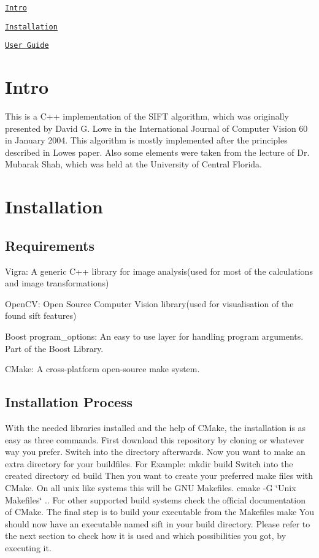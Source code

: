 
\begin{DoxyItemize}
\item \href{#intro}{\tt Intro}
\item \href{#installation}{\tt Installation}
\item \href{#user-guide}{\tt User Guide}
\end{DoxyItemize}

\section*{Intro}

This is a C++ implementation of the S\+I\+F\+T algorithm, which was originally presented by David G. Lowe in the International Journal of Computer Vision 60 in January 2004. This algorithm is mostly implemented after the principles described in Lowe\textquotesingle{}s paper. Also some elements were taken from the lecture of Dr. Mubarak Shah, which was held at the University of Central Florida.

\section*{Installation}

\subsection*{Requirements}


\begin{DoxyItemize}
\item Vigra\+: A generic C++ library for image analysis(used for most of the calculations and image transformations)
\item Open\+C\+V\+: Open Source Computer Vision library(used for visualisation of the found sift features)
\item Boost program\+\_\+options\+: An easy to use layer for handling program arguments. Part of the Boost Library.
\item C\+Make\+: A cross-\/platform open-\/source make system.
\end{DoxyItemize}

\subsection*{Installation Process}

With the needed libraries installed and the help of C\+Make, the installation is as easy as three commands. First download this repository by cloning or whatever way you prefer. Switch into the directory afterwards. Now you want to make an extra directory for your buildfiles. For Example\+: {\ttfamily mkdir build} Switch into the created directory {\ttfamily cd build} Then you want to create your preferred make files with C\+Make. On all unix like systems this will be G\+N\+U Makefiles. {\ttfamily cmake -\/\+G \char`\"{}\+Unix Makefiles\char`\"{} ..} For other supported build systems check the official documentation of C\+Make. The final step is to build your executable from the Makefiles {\ttfamily make} You should now have an executable named sift in your build directory. Please refer to the next section to check how it is used and which possibilities you got, by executing it.

